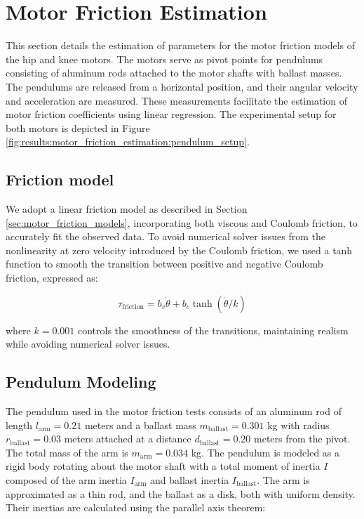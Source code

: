 \section{Motor Friction Estimation}
\label{sec:motor_friction_estimation}

This section details the estimation of parameters for the motor friction models of the hip and knee motors. The motors serve as pivot points for pendulums consisting of aluminum rods attached to the motor shafts with ballast masses. The pendulums are released from a horizontal position, and their angular velocity and acceleration are measured. These measurements facilitate the estimation of motor friction coefficients using linear regression. The experimental setup for both motors is depicted in Figure \ref{fig:results:motor_friction_estimation:pendulum_setup}.

\subsection{Friction model}
We adopt a linear friction model as described in Section \ref{sec:motor_friction_models}, incorporating both viscous and Coulomb friction, to accurately fit the observed data. To avoid numerical solver issues from the nonlinearity at zero velocity introduced by the Coulomb friction, we used a tanh function to smooth the transition between positive and negative Coulomb friction, expressed as:

\begin{equation}
\label{eq:friction_model}
\tau_{\text{friction}} = b_v \dot{\theta} + b_c \tanh( \dot{\theta} / k)
\end{equation}

where \(k = 0.001\) controls the smoothness of the transitions, maintaining realism while avoiding numerical solver issues.

\subsection{Pendulum Modeling}
The pendulum used in the motor friction tests consists of an aluminum rod of length \( l_{\text{arm}} = 0.21 \) meters and a ballast mass \( m_{\text{ballast}} = 0.301 \) kg with radius \( r_{\text{ballast}} = 0.03 \) meters attached at a distance \( d_{\text{ballast}} = 0.20 \) meters from the pivot. The total mass of the arm is \( m_{\text{arm}} = 0.034 \) kg. The pendulum is modeled as a rigid body rotating about the motor shaft with a total moment of inertia \( I \) composed of the arm inertia \( I_{\text{arm}} \) and ballast inertia \( I_{\text{ballast}} \). The arm is approximated as a thin rod, and the ballast as a disk, both with uniform density. Their inertias are calculated using the parallel axis theorem:

